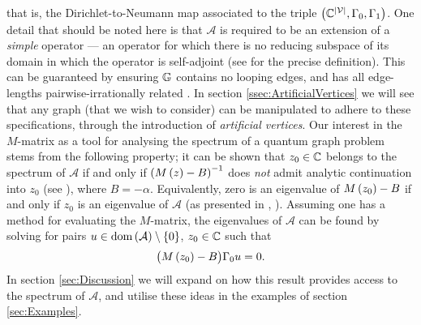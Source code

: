 that is, the Dirichlet-to-Neumann map associated to the triple $\left( \mathbb{C}^{\left\lvert \mathcal{V} \right\rvert},\Gamma_0,\Gamma_1 \right)$.
One detail that should be noted here is that $\mathcal{A}$ is required to be an extension of a \emph{simple} operator --- an operator for which there is no reducing subspace of its domain in which the operator is self-adjoint (see \cite[Section 2.2]{ershova2014isospectrality} for the precise definition).
This can be guaranteed by ensuring $\mathbb{G}$ contains no looping edges, and has all edge-lengths pairwise-irrationally related \cite{ashurova2014simplicity}.
In section \ref{ssec:ArtificialVertices} we will see that any graph (that we wish to consider) can be manipulated to adhere to these specifications, through the introduction of \emph{artificial vertices}.
Our interest in the $M$-matrix as a tool for analysing the spectrum of a quantum graph problem stems from the following property; it can be shown that $z_0\in\mathbb{C}$ belongs to the spectrum of $\mathcal{A}$ if and only if $\left( M\left( z \right) - B \right)^{-1}$ does \emph{not} admit analytic continuation into $z_0$ (see \cite[Theorem 2.1]{ershova2014isospectrality}), where $B=-\alpha$.
Equivalently, zero is an eigenvalue of $M\left( z_0 \right)-B$ if and only if $z_0$ is an eigenvalue of $\mathcal{A}$ (as presented in \cite[Proposition 1]{derkach1991generalized}, \cite[page 698]{cherednichenko2019time}).
Assuming one has a method for evaluating the $M$-matrix, the eigenvalues of $\mathcal{A}$ can be found by solving for pairs $u\in\mathrm{dom}\left( \mathcal{A} \right)\setminus\left\{ 0 \right\}$, $z_0\in\mathbb{C}$ such that
\begin{align*}
	\bigl( M\left( z_0 \right) - B \bigr) \Gamma_0 u = 0.
\end{align*}
In section \ref{sec:Discussion} we will expand on how this result provides access to the spectrum of $\mathcal{A}$, and utilise these ideas in the examples of section \ref{sec:Examples}.


